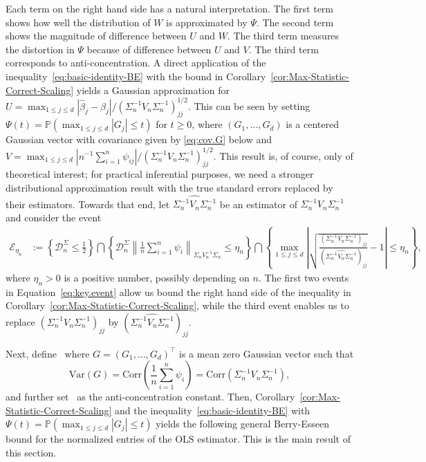 \documentclass{article}
\begin{document}
 
 
 
 
 
 
 
 
 
 
 
 Each term on the right hand side has a natural interpretation. The first term shows how well the distribution of $W$ is approximated by $\Psi$. The second term shows the magnitude of difference between $U$ and $W$. The third term measures the distortion in $\Psi$ because of difference between $U$ and $V$. The third term corresponds to anti-concentration.  
 A direct application of the inequality~\eqref{eq:basic-identity-BE} with the bound in Corollary~\ref{cor:Max-Statistic-Correct-Scaling} yields a Gaussian approximation for $U = \max_{1\le j\le d}|\widehat{\beta}_j - \beta_j|/(\Sigma_n^{-1}V_n\Sigma_n^{-1})_{jj}^{1/2}$. This can be seen by 
  setting $\Psi(t) = \mathbb{P}(\max_{1\le j\le d}|G_j| \le t)$ for $t\ge0$,  where $(G_1,\ldots,G_d)$ is a centered Gaussian vector with covariance given by \eqref{eq:cov.G} below and $V = \max_{1\le j\le d}|{ n^{-1}\sum_{i=1}^n \psi_{ij}}|/{(\Sigma_n^{-1}V_n\Sigma_n^{-1})_{jj}^{1/2}}$.
  This result is, of course, only of theoretical interest;  for practical inferential purposes, we need a stronger distributional approximation result with the true standard errors replaced by their estimators. Towards that end, let $\widehat{\Sigma_n^{-1}V_n\Sigma_n^{-1}}$ be an estimator of $\Sigma_n^{-1}V_n\Sigma_n^{-1}$ and consider the event
 \begin{equation}\label{eq:key.event}
 \begin{split}
 \mathcal{E}_{\eta_n} &:= \left\{\mathcal{D}_n^{\Sigma} \le
 \frac{1}{2}\right\} \bigcap
 \left\{\mathcal{D}_n^{\Sigma}\left\|\frac{1}{n}\sum_{i=1}^n
 \psi_i\right\|_{\Sigma_n V^{-1}_n\Sigma_n} \le
 \eta_n\right\}
 
 
 \bigcap\left\{\max_{1\le j\le   d}
 \left|\sqrt{\frac{(\Sigma_n^{-1}V_n\Sigma_n^{-1})_{jj}}{(\widehat{\Sigma_n^{-1}V_n\Sigma_n^{-1}})_{jj}}}- 1\right| \le \eta_n\right\},
 \end{split}
 \end{equation}
 where $\eta_n>0$ is a positive number, possibly depending on $n$.
 The first two  events in Equation~\eqref{eq:key.event} allow us bound the right hand side of the inequality in Corollary~\ref{cor:Max-Statistic-Correct-Scaling}, while the third event enables us to replace $(\Sigma_n^{-1}V_n\Sigma_n^{-1})_{jj}$ by $(\widehat{\Sigma_n^{-1}V_n\Sigma_n^{-1}})_{jj}$. 
 
 Next, define
 \
 where $G = (G_1,\ldots,G_d)^{\top}$ is a mean zero Gaussian vector such that
 \begin{equation}\label{eq:cov.G}
 \mbox{Var}(G) = \mbox{Corr}\left( \frac{1}{n} \sum_{i=1}^n \psi_i \right) = \mbox{Corr}\left( \Sigma_n^{-1}V_n\Sigma_n^{-1}  \right),
 \end{equation}
  and further set
 \
 as the anti-concentration constant.
 Then, Corollary~\ref{cor:Max-Statistic-Correct-Scaling} and the inequality~\eqref{eq:basic-identity-BE} with $\Psi(t) = \mathbb{P}(\max_{1\le j\le d}|G_j| \le t)$ yields
 the following general Berry-Esseen bound for the normalized entries of the OLS estimator. This is the main result of this section. 
 
\end{document}
